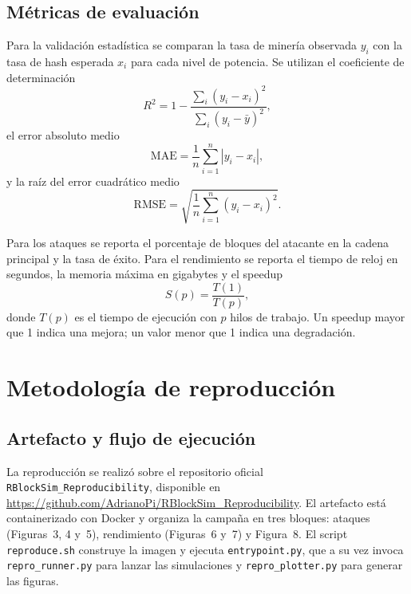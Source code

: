 \documentclass[11pt,a4paper,oneside]{article}
\begin{document}
\subsection{Métricas de evaluación}

Para la validación estadística se comparan la tasa de minería observada $y_i$ con la tasa de hash esperada $x_i$ para cada nivel de potencia. Se utilizan el coeficiente de determinación
\begin{equation}
  R^2 = 1 - \frac{\sum_i (y_i-x_i)^2}{\sum_i (y_i-\bar{y})^2},
  \label{eq:r2}
\end{equation}
el error absoluto medio
\begin{equation}
  \mathrm{MAE} = \frac{1}{n}\sum_{i=1}^{n}|y_i-x_i|,
  \label{eq:mae}
\end{equation}
y la raíz del error cuadrático medio
\begin{equation}
  \mathrm{RMSE} = \sqrt{\frac{1}{n}\sum_{i=1}^{n}(y_i-x_i)^2}.
  \label{eq:rmse}
\end{equation}

Para los ataques se reporta el porcentaje de bloques del atacante en la cadena principal y la tasa de éxito. Para el rendimiento se reporta el tiempo de reloj en segundos, la memoria máxima en gigabytes y el speedup
\begin{equation}
  S(p) = \frac{T(1)}{T(p)},
  \label{eq:speedup}
\end{equation}
donde $T(p)$ es el tiempo de ejecución con $p$ hilos de trabajo. Un speedup mayor que 1 indica una mejora; un valor menor que 1 indica una degradación.

\section{Metodología de reproducción}
\label{sec:metodologia}

\subsection{Artefacto y flujo de ejecución}

La reproducción se realizó sobre el repositorio oficial \texttt{RBlockSim\_Reproducibility}, disponible en \url{https://github.com/AdrianoPi/RBlockSim_Reproducibility}. El artefacto está containerizado con Docker y organiza la campaña en tres bloques: ataques (Figuras~3, 4 y~5), rendimiento (Figuras~6 y~7) y Figura~8. El script \texttt{reproduce.sh} construye la imagen y ejecuta \texttt{entrypoint.py}, que a su vez invoca \texttt{repro\_runner.py} para lanzar las simulaciones y \texttt{repro\_plotter.py} para generar las figuras.
\end{document}
